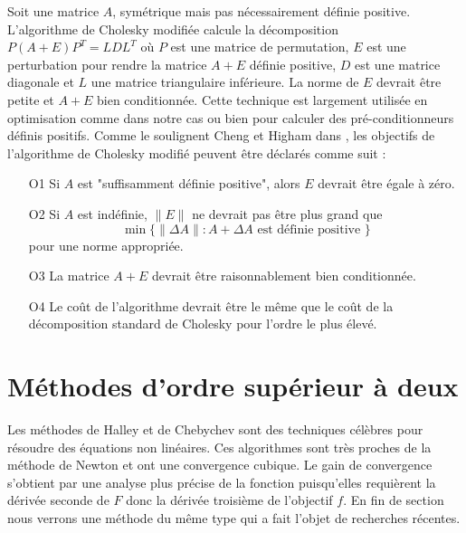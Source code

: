 Soit une matrice $A$, sym\'etrique mais pas n\'ecessairement d\'efinie positive. L'algorithme de Cholesky modifi\'ee
calcule la d\'ecomposition $P(A+E)P^T=LDL^T$ o\`u $P$ est une matrice de permutation, $E$ est une
perturbation pour rendre la matrice $A+E$ d\'efinie positive, $D$ est une matrice diagonale et 
$L$ une matrice triangulaire inf\'erieure. La norme de $E$ devrait être petite et $A+E$ 
bien conditionn\'ee. Cette technique est largement utilis\'ee en optimisation comme dans notre cas ou bien pour 
calculer des pr\'e-conditionneurs d\'efinis positifs.
Comme le soulignent Cheng et Higham dans \cite{Higham}, les objectifs de l'algorithme de Cholesky modifi\'e peuvent être d\'eclar\'es
comme suit :
\begin{itemize}
\item[O1] Si $A$ est "suffisamment d\'efinie positive", alors $E$ devrait être \'egale \`a z\'ero.
\item[O2] Si $A$ est ind\'efinie, $\lVert E \rVert$ ne devrait pas être plus grand que 
\[\min\{\lVert \Delta A \rVert: A+\Delta A \text{ est d\'efinie positive } \} \]
pour une norme appropri\'ee.
\item[O3] La matrice $A+E$ devrait être raisonnablement bien conditionn\'ee. 
\item[O4] Le coût de l'algorithme devrait être le même que le coût de la d\'ecomposition standard de Cholesky
 pour l'ordre le plus \'elev\'e.
\end{itemize}











\section{M\'ethodes d'ordre sup\'erieur \`a deux}
Les m\'ethodes de Halley et de Chebychev sont des techniques c\'el\`ebres pour r\'esoudre des \'equations non lin\'eaires. Ces algorithmes
sont tr\`es proches de la m\'ethode de Newton et ont une convergence cubique. Le gain de convergence s'obtient par une analyse
plus pr\'ecise de la fonction puisqu'elles requi\`erent la d\'eriv\'ee seconde de $F$ donc la d\'eriv\'ee troisi\`eme de l'objectif $f$.
En fin de section nous verrons une m\'ethode du même type qui a fait l'objet de recherches r\'ecentes.

